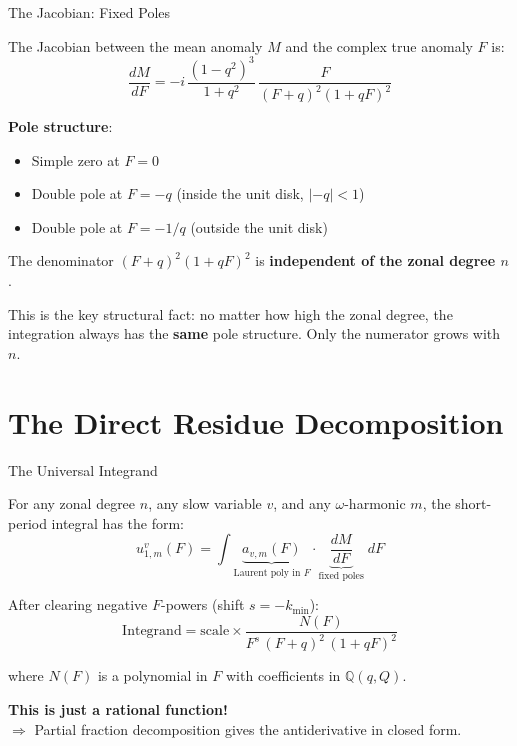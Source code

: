 \documentclass[aspectratio=169, 11pt]{beamer}
\begin{document}
\begin{frame}{The Jacobian: Fixed Poles}

The Jacobian between the mean anomaly $M$ and the complex true anomaly
$F$ is:
\[
\boxed{
\frac{dM}{dF}
= -i\,\frac{(1-q^2)^3}{1+q^2}\,
\frac{F}{(F+q)^2(1+qF)^2}
}
\]

\vspace{0.5em}
\textbf{Pole structure}:
\begin{itemize}
    \item Simple zero at $F = 0$
    \item Double pole at $F = -q$ \quad (inside the unit disk, $|{-}q| < 1$)
    \item Double pole at $F = -1/q$ \quad (outside the unit disk)
\end{itemize}

\vspace{0.8em}
\begin{center}
\alert{The denominator $(F+q)^2(1+qF)^2$ is
\textbf{independent of the zonal degree $n$}.}
\end{center}

\vspace{0.5em}
This is the key structural fact: no matter how high the zonal degree,
the integration always has the \textbf{same} pole structure.
Only the numerator grows with $n$.

\end{frame}

\section{The Direct Residue Decomposition}

\begin{frame}{The Universal Integrand}

For any zonal degree $n$, any slow variable $v$, and any
$\omega$-harmonic $m$, the short-period integral has the form:
\[
u_{1,m}^v(F)
= \int
\underbrace{a_{v,m}(F)}_{\text{Laurent poly in } F}
\cdot
\underbrace{\frac{dM}{dF}}_{\text{fixed poles}}
\; dF
\]

After clearing negative $F$-powers (shift $s = -k_{\min}$):
\[
\boxed{
\text{Integrand} = \text{scale} \times
\frac{N(F)}{F^s\,(F+q)^2\,(1+qF)^2}
}
\]

where $N(F)$ is a polynomial in $F$ with coefficients in $\mathbb{Q}(q, Q)$.

\vspace{0.5em}
\textbf{This is just a rational function!}\\[0.3em]
$\Rightarrow$ Partial fraction decomposition gives the antiderivative
in closed form.

\end{frame}
\end{document}
